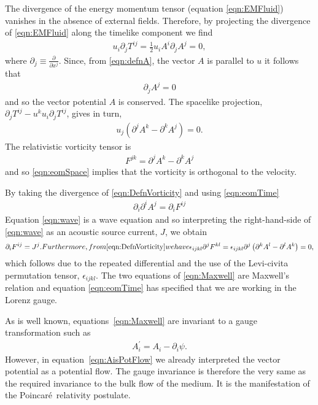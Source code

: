 \documentclass[10pt, fleqn,final,showtrims,oldfontcommands]{article} %
\newcommand{\sub}[1]{\begin{subequations}#1\end{subequations}}
\newcommand{\eqa}[1]{\begin{align}#1\end{align}}
\newcommand{\eqal}[2]{\begin{align}#1\label{eqn:#2}\end{align}}
\newcommand{\eqnref}[1]{\ref{eqn:#1}}
\newcommand{\lr}[1]{\left( #1 \right)}
\renewcommand{\d}{\partial}
\newcommand{\del}{\nabla}
\newcommand{\scope}[1]{\tilde{#1}}
\newcommand{\half}{\tfrac{1}{2}}
\newcommand{\Poincare}{Poincar{\'e}}
\begin{document}
The divergence of the energy momentum tensor (equation \eqnref{EMFluid}) vanishes in the absence of external fields.
Therefore, by projecting the divergence of \eqnref{EMFluid} along the timelike component we find
\eqa{
  u_i \d_j T^{i j} = \half u_i A^i \d_j A^j = 0,
}
where $\d_j \equiv \frac{\d}{\d x^j}$.
Since, from \eqnref{defnA}, the vector $A$ is parallel to $u$  it follows that 
\eqal{
  \d_j A^j = 0
}{eomTime}
and so the vector potential $A$ is conserved.
The spacelike projection,
$\d_j T^{i j} - u^k u_i \d_j T^{i j}$, gives in turn,
\eqal{
u_j \lr{\d^j A^k - \d^k A^j} = 0.
}{eomSpace}
The relativistic vorticity tensor is 
\eqal{
F^{j k} =\d^j A^k - \d^k A^j
}{DefnVorticity}
and so \eqnref{eomSpace} implies that the vorticity is orthogonal to the velocity.

By taking the divergence of \eqnref{DefnVorticity} and using \eqnref{eomTime} 
\eqal{
  \d_i \d^i A^j = \d_i F^{i j}
}{wave}
Equation \eqnref{wave} is a wave equation and so interpreting the right-hand-side of \eqnref{wave} as an acoustic source current, $J$, we obtain
\sub{
\label{eqn:Maxwell}
\eqa{
  \d_i F^{i j} = J^j.
}
Furthermore, from \eqnref{DefnVorticity} we have
\begin{align}
  \epsilon_{i j k l} \d^j F^{k l} = \epsilon_{i j k l} \d^j \lr{\d^k A^l - \d^l A^k} = 0,
\end{align}
}
which follows due to the repeated differential and the use of the Levi-civita permutation tensor, $\epsilon_{i j k l}$.
The two equations of \eqnref{Maxwell} are Maxwell's relation and equation \eqnref{eomTime} has specified that we are working in the Lorenz gauge.

As is well known, equations~\eqnref{Maxwell} are invariant to a gauge transformation such as
\begin{align}
  A_i^\prime = A_i - \d_i \psi.
\end{align}
However, in equation~\eqnref{AisPotFlow} we already interpreted the vector potential as a potential flow.
The gauge invariance is therefore the very same as the required invariance to the bulk flow of the medium.
It is the manifestation of the \Poincare\ relativity postulate.
\end{document}
